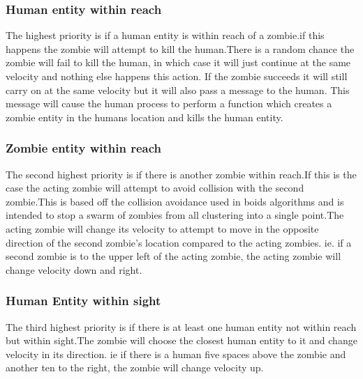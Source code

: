 \subsubsection{Human entity within reach}
The highest priority is if a human entity is within reach of a zombie.if this happens the zombie will attempt to kill the human.There is a random chance the zombie will fail to kill the human, in which case it will just continue at the same velocity and nothing else happens this action. If the zombie succeeds it will still carry on at the same velocity but it will also pass a message to the human. This message will cause the human process to perform a function which creates a zombie entity in the humans location and kills the human entity.

\subsubsection{Zombie entity within reach}
The second highest priority is if there is another zombie within reach.If this is the case the acting zombie will attempt to avoid collision with the second zombie.This is based off the collision avoidance used in boids algorithms and is intended to stop a swarm of zombies from all clustering into a single point.The acting zombie will change its velocity to attempt to move in the opposite direction of the second zombie's location compared to the acting zombies. ie. if a second zombie is to the upper left of the acting zombie, the acting zombie will change velocity down and right.

\subsubsection{Human Entity within sight}
The third highest priority is if there is at least one human entity not within reach but within sight.The zombie will choose the closest human entity to it and change velocity in its direction. ie if there is a human five spaces above the zombie and another ten to the right, the zombie will change velocity up.

